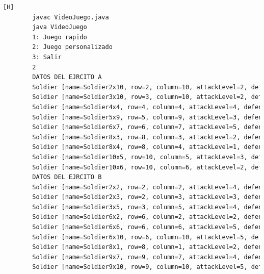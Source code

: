 \documentclass{article}
\begin{document}
	\begin{lstlisting}[language=bash,caption={Compilando y probando el metodo exchangeSoldier  }][H]
		javac VideoJuego.java
		java VideoJuego
		1: Juego rapido
		2: Juego personalizado
		3: Salir
		2
		DATOS DEL EJRCITO A
		Soldier [name=Soldier2x10, row=2, column=10, attackLevel=2, defenseLevel=2, actualLife=2, speed=0, attitude=Repose, current=true]
		Soldier [name=Soldier3x10, row=3, column=10, attackLevel=2, defenseLevel=3, actualLife=2, speed=0, attitude=Repose, current=true]
		Soldier [name=Soldier4x4, row=4, column=4, attackLevel=4, defenseLevel=5, actualLife=3, speed=0, attitude=Repose, current=true]
		Soldier [name=Soldier5x9, row=5, column=9, attackLevel=3, defenseLevel=3, actualLife=2, speed=0, attitude=Repose, current=true]
		Soldier [name=Soldier6x7, row=6, column=7, attackLevel=5, defenseLevel=1, actualLife=4, speed=0, attitude=Repose, current=true]
		Soldier [name=Soldier8x3, row=8, column=3, attackLevel=2, defenseLevel=4, actualLife=5, speed=0, attitude=Repose, current=true]
		Soldier [name=Soldier8x4, row=8, column=4, attackLevel=1, defenseLevel=1, actualLife=2, speed=0, attitude=Repose, current=true]
		Soldier [name=Soldier10x5, row=10, column=5, attackLevel=3, defenseLevel=2, actualLife=5, speed=0, attitude=Repose, current=true]
		Soldier [name=Soldier10x6, row=10, column=6, attackLevel=2, defenseLevel=5, actualLife=4, speed=0, attitude=Repose, current=true]
		DATOS DEL EJRCITO B
		Soldier [name=Soldier2x2, row=2, column=2, attackLevel=4, defenseLevel=3, actualLife=3, speed=0, attitude=Repose, current=true]
		Soldier [name=Soldier2x3, row=2, column=3, attackLevel=3, defenseLevel=3, actualLife=3, speed=0, attitude=Repose, current=true]
		Soldier [name=Soldier3x5, row=3, column=5, attackLevel=4, defenseLevel=5, actualLife=1, speed=0, attitude=Repose, current=true]
		Soldier [name=Soldier6x2, row=6, column=2, attackLevel=2, defenseLevel=5, actualLife=4, speed=0, attitude=Repose, current=true]
		Soldier [name=Soldier6x6, row=6, column=6, attackLevel=5, defenseLevel=3, actualLife=3, speed=0, attitude=Repose, current=true]
		Soldier [name=Soldier6x10, row=6, column=10, attackLevel=5, defenseLevel=4, actualLife=1, speed=0, attitude=Repose, current=true]
		Soldier [name=Soldier8x1, row=8, column=1, attackLevel=2, defenseLevel=4, actualLife=4, speed=0, attitude=Repose, current=true]
		Soldier [name=Soldier9x7, row=9, column=7, attackLevel=4, defenseLevel=3, actualLife=2, speed=0, attitude=Repose, current=true]
		Soldier [name=Soldier9x10, row=9, column=10, attackLevel=5, defenseLevel=2, actualLife=5, speed=0, attitude=Repose, current=true]

\end{lstlisting}
\end{document}
